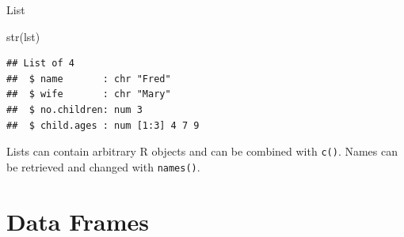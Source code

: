 \documentclass[
  9pt,
  ignorenonframetext,
]{beamer}
\newenvironment{Shaded}{\begin{snugshade}}{\end{snugshade}}
\newcommand{\KeywordTok}[1]{\textcolor[rgb]{0.94,0.87,0.69}{#1}}
\newcommand{\NormalTok}[1]{\textcolor[rgb]{0.80,0.80,0.80}{#1}}
\begin{document}
\begin{frame}[fragile]{List}
\begin{Shaded}
\begin{Highlighting}[]
\KeywordTok{str}\NormalTok{(lst)}
\end{Highlighting}
\end{Shaded}

\begin{verbatim}
## List of 4
##  $ name       : chr "Fred"
##  $ wife       : chr "Mary"
##  $ no.children: num 3
##  $ child.ages : num [1:3] 4 7 9
\end{verbatim}

\vfill

\begin{block}{}
\protect\hypertarget{section-3}{}
Lists can contain arbitrary R objects and can be combined with
\texttt{c()}. Names can be retrieved and changed with \texttt{names()}.
\end{block}
\end{frame}

\hypertarget{data-frames}{%
\section{Data Frames}\label{data-frames}}
\end{document}
